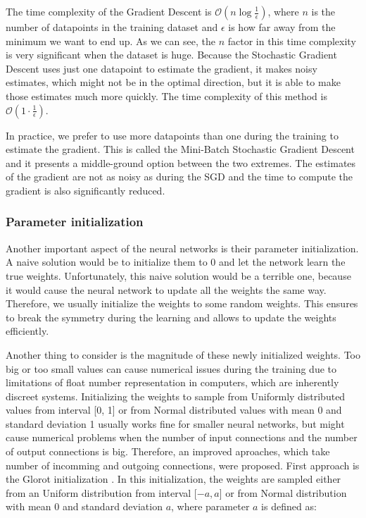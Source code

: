 The time complexity of the Gradient Descent is $\mathcal{O}(n\log{\frac{1}{\epsilon}})$, where $n$ is the number of datapoints in the training dataset and $\epsilon$ is how far away from the minimum we want to end up.
As we can see, the $n$ factor in this time complexity is very significant when the dataset is huge.
Because the Stochastic Gradient Descent uses just one datapoint to estimate the gradient, it makes noisy estimates, which might not be in the optimal direction, but it is able to make those estimates much more quickly.
The time complexity of this method is $\mathcal{O}(1\cdot\frac{1}{\epsilon})$.

In practice, we prefer to use more datapoints than one during the training to estimate the gradient.
This is called the Mini-Batch Stochastic Gradient Descent and it presents a middle-ground option between the two extremes.
The estimates of the gradient are not as noisy as during the SGD and the time to compute the gradient is also significantly reduced. 

\subsubsection{Parameter initialization}
Another important aspect of the neural networks is their parameter initialization.
A naive solution would be to initialize them to 0 and let the network learn the true weights.
Unfortunately, this naive solution would be a terrible one, because it would cause the neural network to update all the weights the same way.
Therefore, we usually initialize the weights to some random weights.
This ensures to break the symmetry during the learning and allows to update the weights efficiently.

Another thing to consider is the magnitude of these newly initialized weights.
Too big or too small values can cause numerical issues during the training due to limitations of float number representation in computers, which are inherently discreet systems.
Initializing the weights to sample from Uniformly distributed values from interval [0, 1] or from Normal distributed values with mean 0 and standard deviation 1 usually works fine for smaller neural networks, but might cause numerical problems when the number of input connections and the number of output connections is big.
Therefore, an improved aproaches, which take number of incomming and outgoing connections, were proposed.
First approach is the Glorot initialization \cite{glorot2010understanding}.
In this initialization, the weights are sampled either from an Uniform distribution from interval [$-a, a$] or from Normal distribution with mean 0 and standard deviation $a$, where parameter $a$ is defined as:

